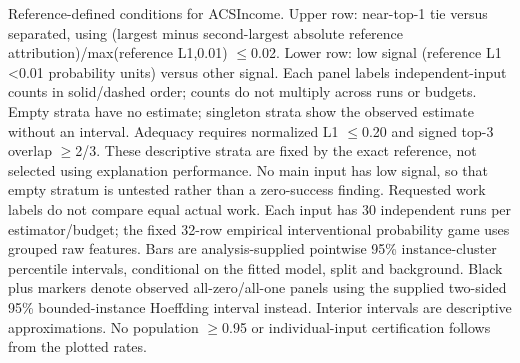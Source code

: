 Reference-defined conditions for ACSIncome. Upper row: near-top-1 tie versus separated, using (largest minus second-largest absolute reference attribution)/max(reference L1,0.01) $\leq$0.02. Lower row: low signal (reference L1 <0.01 probability units) versus other signal. Each panel labels independent-input counts in solid/dashed order; counts do not multiply across runs or budgets. Empty strata have no estimate; singleton strata show the observed estimate without an interval. Adequacy requires normalized L1 $\leq$0.20 and signed top-3 overlap $\geq$2/3. These descriptive strata are fixed by the exact reference, not selected using explanation performance. No main input has low signal, so that empty stratum is untested rather than a zero-success finding. Requested work labels do not compare equal actual work. Each input has 30 independent runs per estimator/budget; the fixed 32-row empirical interventional probability game uses grouped raw features. Bars are analysis-supplied pointwise 95\% instance-cluster percentile intervals, conditional on the fitted model, split and background. Black plus markers denote observed all-zero/all-one panels using the supplied two-sided 95\% bounded-instance Hoeffding interval instead. Interior intervals are descriptive approximations. No population $\geq$0.95 or individual-input certification follows from the plotted rates.
